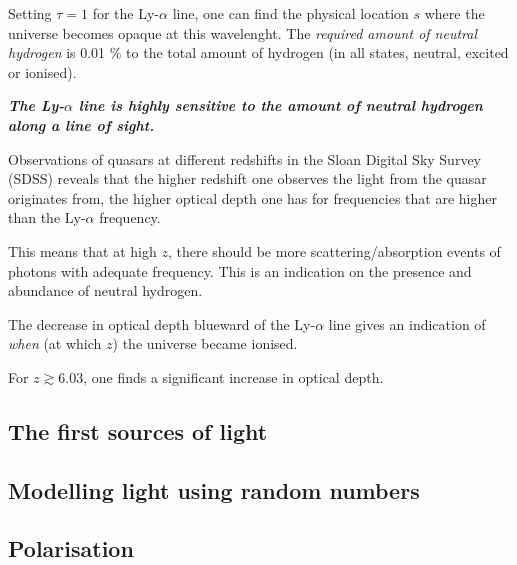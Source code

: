 \documentclass[noxcolor]{article}
\begin{document}
Setting $\tau = 1$ for the Ly-$\alpha$ line, one can find the physical location $s$ where the universe becomes opaque at this wavelenght. The \textit{required amount of neutral hydrogen} is 0.01 \% to the total amount of hydrogen (in all states, neutral, excited or ionised).

{\center
    \textit{\textbf{The Ly-$\alpha$ line is highly sensitive to the amount of neutral hydrogen along a line of sight.}}
}

Observations of quasars at different redshifts in the Sloan Digital Sky Survey (SDSS) reveals that the higher redshift one observes the light from the quasar originates from, the higher optical depth one has for frequencies that are higher than the Ly-$\alpha$ frequency. 

This means that at high $z$, there should be more scattering/absorption events of photons with adequate frequency. This is an indication on the presence and abundance of neutral hydrogen. 

The decrease in optical depth blueward of the Ly-$\alpha$ line gives an indication of \textit{when} (at which $z$) the universe became ionised. 

For $z \gtrsim 6.03$, one finds a significant increase in optical depth.

\begin{frame}
    \section{The first sources of light}
    
\end{frame}

\begin{frame}
    \section{Modelling light using random numbers}

\end{frame}

\begin{frame}
    \section{Polarisation}
\end{frame}

\begin{frame}



%
%

    
\end{frame}
\end{document}
